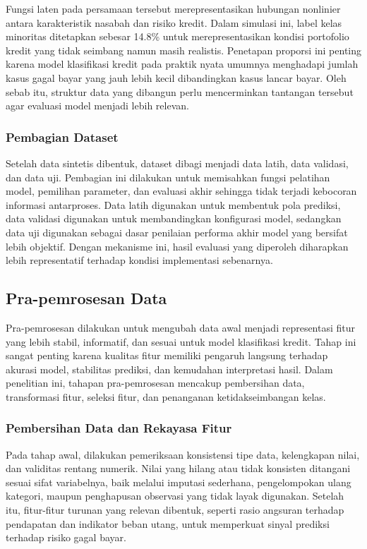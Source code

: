 Fungsi laten pada persamaan tersebut merepresentasikan hubungan nonlinier antara karakteristik nasabah dan risiko kredit. Dalam simulasi ini, label kelas minoritas ditetapkan sebesar 14.8\% untuk merepresentasikan kondisi portofolio kredit yang tidak seimbang namun masih realistis. Penetapan proporsi ini penting karena model klasifikasi kredit pada praktik nyata umumnya menghadapi jumlah kasus gagal bayar yang jauh lebih kecil dibandingkan kasus lancar bayar. Oleh sebab itu, struktur data yang dibangun perlu mencerminkan tantangan tersebut agar evaluasi model menjadi lebih relevan.

\subsubsection{Pembagian Dataset}
Setelah data sintetis dibentuk, dataset dibagi menjadi data latih, data validasi, dan data uji. Pembagian ini dilakukan untuk memisahkan fungsi pelatihan model, pemilihan parameter, dan evaluasi akhir sehingga tidak terjadi kebocoran informasi antarproses. Data latih digunakan untuk membentuk pola prediksi, data validasi digunakan untuk membandingkan konfigurasi model, sedangkan data uji digunakan sebagai dasar penilaian performa akhir model yang bersifat lebih objektif. Dengan mekanisme ini, hasil evaluasi yang diperoleh diharapkan lebih representatif terhadap kondisi implementasi sebenarnya.

\subsection{Pra-pemrosesan Data}
Pra-pemrosesan dilakukan untuk mengubah data awal menjadi representasi fitur yang lebih stabil, informatif, dan sesuai untuk model klasifikasi kredit. Tahap ini sangat penting karena kualitas fitur memiliki pengaruh langsung terhadap akurasi model, stabilitas prediksi, dan kemudahan interpretasi hasil. Dalam penelitian ini, tahapan pra-pemrosesan mencakup pembersihan data, transformasi fitur, seleksi fitur, dan penanganan ketidakseimbangan kelas.

\subsubsection{Pembersihan Data dan Rekayasa Fitur}
Pada tahap awal, dilakukan pemeriksaan konsistensi tipe data, kelengkapan nilai, dan validitas rentang numerik. Nilai yang hilang atau tidak konsisten ditangani sesuai sifat variabelnya, baik melalui imputasi sederhana, pengelompokan ulang kategori, maupun penghapusan observasi yang tidak layak digunakan. Setelah itu, fitur-fitur turunan yang relevan dibentuk, seperti rasio angsuran terhadap pendapatan dan indikator beban utang, untuk memperkuat sinyal prediksi terhadap risiko gagal bayar.

